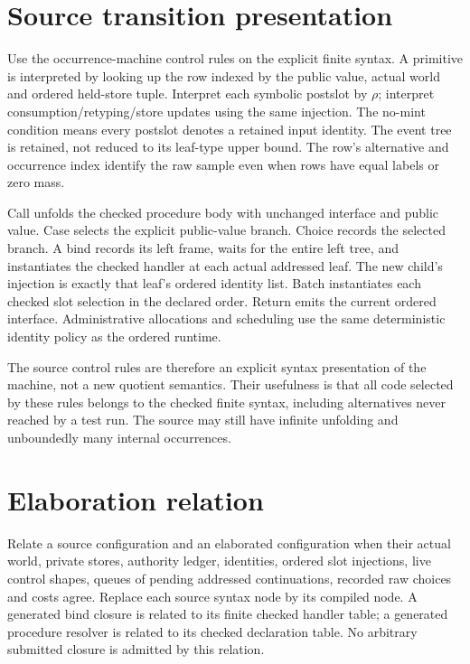 \documentclass[11pt]{article}
\begin{document}
\section{Source transition presentation}
Use the occurrence-machine control rules on the explicit finite syntax. A primitive is interpreted by looking up the row indexed by the public value, actual world and ordered held-store tuple. Interpret each symbolic postslot by $\rho$; interpret consumption/retyping/store updates using the same injection. The no-mint condition means every postslot denotes a retained input identity. The event tree is retained, not reduced to its leaf-type upper bound. The row's alternative and occurrence index identify the raw sample even when rows have equal labels or zero mass.

Call unfolds the checked procedure body with unchanged interface and public value. Case selects the explicit public-value branch. Choice records the selected branch. A bind records its left frame, waits for the entire left tree, and instantiates the checked handler at each actual addressed leaf. The new child's injection is exactly that leaf's ordered identity list. Batch instantiates each checked slot selection in the declared order. Return emits the current ordered interface. Administrative allocations and scheduling use the same deterministic identity policy as the ordered runtime.

The source control rules are therefore an explicit syntax presentation of the machine, not a new quotient semantics. Their usefulness is that all code selected by these rules belongs to the checked finite syntax, including alternatives never reached by a test run. The source may still have infinite unfolding and unboundedly many internal occurrences.

\section{Elaboration relation}
Relate a source configuration and an elaborated configuration when their actual world, private stores, authority ledger, identities, ordered slot injections, live control shapes, queues of pending addressed continuations, recorded raw choices and costs agree. Replace each source syntax node by its compiled node. A generated bind closure is related to its finite checked handler table; a generated procedure resolver is related to its checked declaration table. No arbitrary submitted closure is admitted by this relation.
\end{document}
